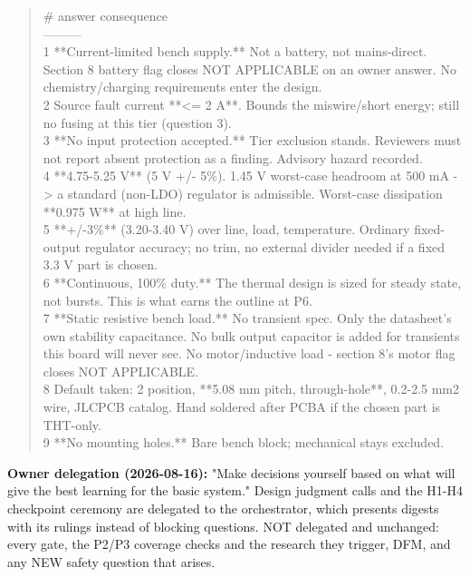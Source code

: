 \documentclass[11pt,a4paper]{article}
\begin{document}
\begin{quote}\small\ttfamily\raggedright
\textbar{} \# \textbar{} answer \textbar{} consequence \textbar{}\\
\textbar{}---\textbar{}---\textbar{}---\textbar{}\\
\textbar{} 1 \textbar{} {*}{*}Current-limited bench supply.{*}{*} Not a battery, not mains-direct. \textbar{} Section 8 battery flag closes NOT APPLICABLE on an owner answer. No chemistry/charging requirements enter the design. \textbar{}\\
\textbar{} 2 \textbar{} Source fault current {*}{*}\textless{}= 2 A{*}{*}. \textbar{} Bounds the miswire/short energy; still no fusing at this tier (question 3). \textbar{}\\
\textbar{} 3 \textbar{} {*}{*}No input protection accepted.{*}{*} \textbar{} Tier exclusion stands. Reviewers must not report absent protection as a finding. Advisory hazard recorded. \textbar{}\\
\textbar{} 4 \textbar{} {*}{*}4.75-5.25 V{*}{*} (5 V +/- 5\%). \textbar{} 1.45 V worst-case headroom at 500 mA -\textgreater{} a standard (non-LDO) regulator is admissible. Worst-case dissipation {*}{*}0.975 W{*}{*} at high line. \textbar{}\\
\textbar{} 5 \textbar{} {*}{*}+/-3\%{*}{*} (3.20-3.40 V) over line, load, temperature. \textbar{} Ordinary fixed-output regulator accuracy; no trim, no external divider needed if a fixed 3.3 V part is chosen. \textbar{}\\
\textbar{} 6 \textbar{} {*}{*}Continuous, 100\% duty.{*}{*} \textbar{} The thermal design is sized for steady state, not bursts. This is what earns the outline at P6. \textbar{}\\
\textbar{} 7 \textbar{} {*}{*}Static resistive bench load.{*}{*} No transient spec. \textbar{} Only the datasheet's own stability capacitance. No bulk output capacitor is added for transients this board will never see. No motor/inductive load - section 8's motor flag closes NOT APPLICABLE. \textbar{}\\
\textbar{} 8 \textbar{} Default taken: 2 position, {*}{*}5.08 mm pitch, through-hole{*}{*}, 0.2-2.5 mm2 wire, JLCPCB catalog. \textbar{} Hand soldered after PCBA if the chosen part is THT-only. \textbar{}\\
\textbar{} 9 \textbar{} {*}{*}No mounting holes.{*}{*} \textbar{} Bare bench block; mechanical stays excluded. \textbar{}
\end{quote}
\textbf{Owner delegation (2026-08-16):} "Make decisions yourself based on what will give the best learning for the basic system." Design judgment calls and the H1-H4 checkpoint ceremony are delegated to the orchestrator, which presents digests with its rulings instead of blocking questions. NOT delegated and unchanged: every gate, the P2/P3 coverage checks and the research they trigger, DFM, and any NEW safety question that arises.
\end{document}

